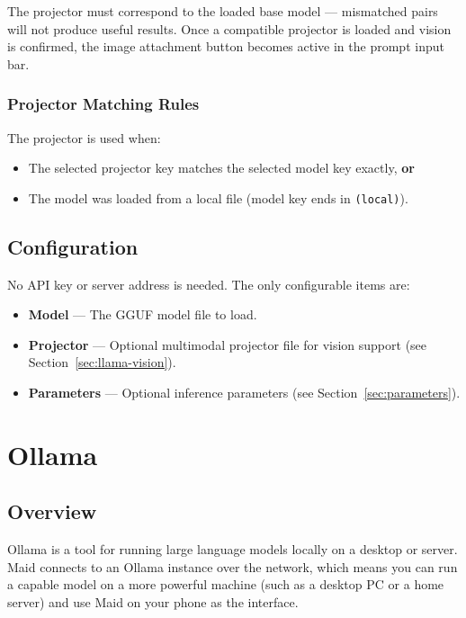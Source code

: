 \documentclass[12pt,a4paper]{article}
\begin{document}
The projector must correspond to the loaded base model — mismatched pairs will not produce useful results. Once a compatible projector is loaded and vision is confirmed, the image attachment button becomes active in the prompt input bar.

\subsubsection{Projector Matching Rules}

The projector is used when:
\begin{itemize}[noitemsep]
    \item The selected projector key matches the selected model key exactly, \textbf{or}
    \item The model was loaded from a local file (model key ends in \texttt{(local)}).
\end{itemize}

\subsection{Configuration}

No API key or server address is needed. The only configurable items are:

\begin{itemize}[noitemsep]
    \item \textbf{Model} — The GGUF model file to load.
    \item \textbf{Projector} — Optional multimodal projector file for vision support (see Section~\ref{sec:llama-vision}).
    \item \textbf{Parameters} — Optional inference parameters (see Section~\ref{sec:parameters}).
\end{itemize}

\section{Ollama}

\subsection{Overview}

Ollama is a tool for running large language models locally on a desktop or server. Maid connects to an Ollama instance over the network, which means you can run a capable model on a more powerful machine (such as a desktop PC or a home server) and use Maid on your phone as the interface.
\end{document}
